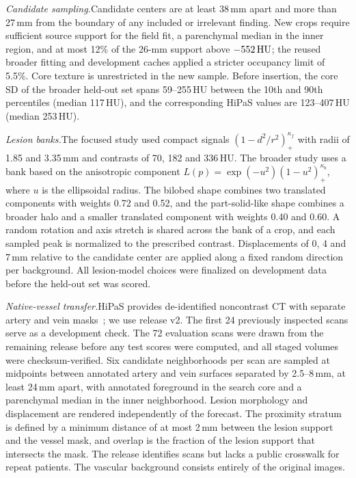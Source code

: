 \smallskip\noindent\textit{Candidate sampling.}\enspace Candidate centers are at least 38\,mm apart and more than 27\,mm from the boundary of any included or irrelevant finding. New crops require sufficient source support for the field fit, a parenchymal median in the inner region, and at most 12\% of the 26-mm support above $-552\,\mathrm{HU}$; the reused broader fitting and development caches applied a stricter occupancy limit of 5.5\%. Core texture is unrestricted in the new sample. Before insertion, the core SD of the broader held-out set spans 59--255\,HU between the 10th and 90th percentiles (median 117\,HU), and the corresponding HiPaS values are 123--407\,HU (median 253\,HU).

\smallskip\noindent\textit{Lesion banks.}\enspace The focused study used compact signals $(1-d^2/r^2)_+^{\kappa_f}$ with radii of 1.85 and 3.35\,mm and contrasts of 70, 182 and 336\,HU. The broader study uses a bank based on the anisotropic component $L(p)=\exp(-u^2)(1-u^2)_+^{\kappa_b}$, where $u$ is the ellipsoidal radius. The bilobed shape combines two translated components with weights 0.72 and 0.52, and the part-solid-like shape combines a broader halo and a smaller translated component with weights 0.40 and 0.60. A random rotation and axis stretch is shared across the bank of a crop, and each sampled peak is normalized to the prescribed contrast. Displacements of 0, 4 and 7\,mm relative to the candidate center are applied along a fixed random direction per background. All lesion-model choices were finalized on development data before the held-out set was scored.

\smallskip\noindent\textit{Native-vessel transfer.}\enspace HiPaS provides de-identified noncontrast CT with separate artery and vein masks~\cite{chu2025hipas}; we use release v2. The first 24 previously inspected scans serve as a development check. The 72 evaluation scans were drawn from the remaining release before any test scores were computed, and all staged volumes were checksum-verified. Six candidate neighborhoods per scan are sampled at midpoints between annotated artery and vein surfaces separated by 2.5--8\,mm, at least 24\,mm apart, with annotated foreground in the search core and a parenchymal median in the inner neighborhood. Lesion morphology and displacement are rendered independently of the forecast. The proximity stratum is defined by a minimum distance of at most 2\,mm between the lesion support and the vessel mask, and overlap is the fraction of the lesion support that intersects the mask. The release identifies scans but lacks a public crosswalk for repeat patients. The vascular background consists entirely of the original images.

